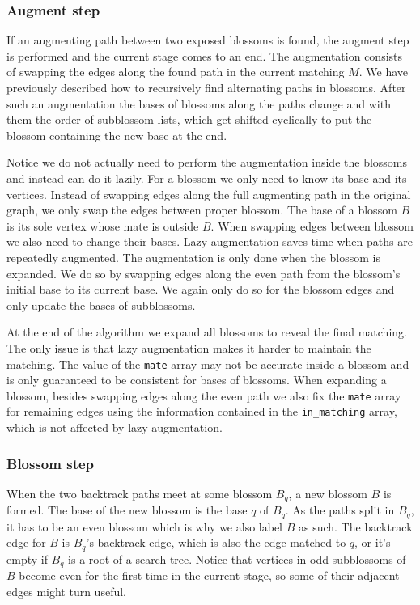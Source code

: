 \subsubsection*{Augment step}

If an augmenting path between two exposed blossoms is found, the augment step is performed and the current stage comes to an end. The augmentation consists of swapping the edges along the found path in the current matching $M$. We have previously described how to recursively find alternating paths in blossoms. After such an augmentation the bases of blossoms along the paths change and with them the order of subblossom lists, which get shifted cyclically to put the blossom containing the new base at the end. 

Notice we do not actually need to perform the augmentation inside the blossoms and instead can do it lazily. For a blossom we only need to know its base and its vertices. Instead of swapping edges along the full augmenting path in the original graph, we only swap the edges between proper blossom. The base of a blossom $B$ is its sole vertex whose mate is outside $B$. When swapping edges between blossom we also need to change their bases. Lazy augmentation saves time when paths are repeatedly augmented. The augmentation is only done when the blossom is expanded. We do so by swapping edges along the even path from the blossom's initial base to its current base. We again only do so for the blossom edges and only update the bases of subblossoms.

At the end of the algorithm we expand all blossoms to reveal the final matching. The only issue is that lazy augmentation makes it harder to maintain the matching. The value of the \texttt{mate} array may not be accurate inside a blossom and is only guaranteed to be consistent for bases of blossoms.  When expanding a blossom, besides swapping edges along the even path we also fix the \texttt{mate} array for remaining edges using the information contained in the \texttt{in\_matching} array, which is not affected by lazy augmentation.

\subsubsection*{Blossom step}

When the two backtrack paths meet at some blossom $B_q$, a new blossom $B$ is formed. The base of the new blossom is the base $q$ of $B_q$. As the paths split in $B_q$, it has to be an even blossom which is why we also label $B$ as such. The backtrack edge for $B$ is $B_q$'s backtrack edge, which is also the edge matched to $q$, or it's empty if $B_q$ is a root of a search tree. Notice that vertices in odd subblossoms of $B$ become even for the first time in the current stage, so some of their adjacent edges might turn useful.

